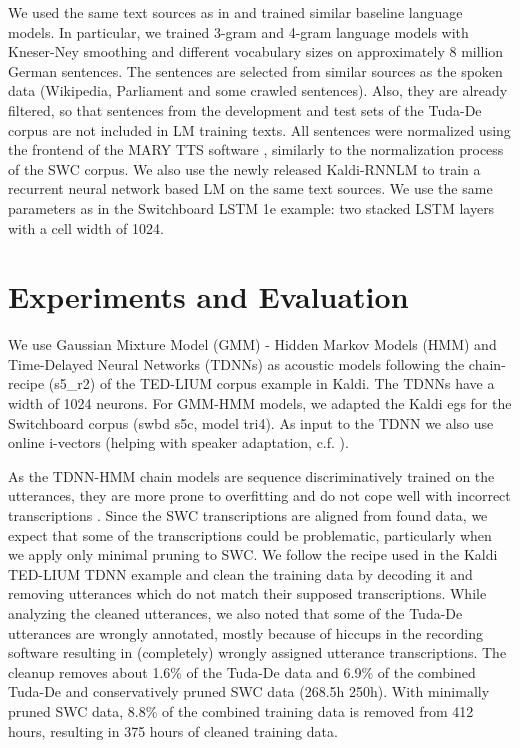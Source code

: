 \documentclass[a4paper]{article}
\begin{document}
We used the same text sources as in \cite{radeck2015open} and trained similar baseline language models. In particular, we trained 3-gram and 4-gram language models with Kneser-Ney smoothing \cite{kneser1995improved} and different vocabulary sizes on approximately 8 million German sentences. The sentences are selected from similar sources as the spoken data (Wikipedia, Parliament and some crawled sentences). Also, they are already filtered, so that sentences from the development and test sets of the Tuda-De corpus are not included in LM training texts. All sentences were normalized using the frontend of the MARY TTS software \cite{schroder2003german}, similarly to the normalization process of the SWC corpus.
We also use the newly released Kaldi-RNNLM \cite{xu2018neural} to train a recurrent neural network based LM on the same text sources. We use the same parameters as in the Switchboard LSTM 1e example: two stacked LSTM layers with a cell width of 1024.


\section{Experiments and Evaluation}
\label{sec:experiments}




We use Gaussian Mixture Model (GMM) - Hidden Markov Models (HMM) and Time-Delayed Neural Networks (TDNNs) \cite{waibel1990phoneme, peddinti2015time} as acoustic models following the chain-recipe (s5\_r2) of the TED-LIUM corpus \cite{rousseau2014enhancing} example in Kaldi. The TDNNs have a width of 1024 neurons. For GMM-HMM models, we adapted the Kaldi egs for the Switchboard corpus (swbd s5c, model tri4). As input to the TDNN we also use online i-vectors (helping with speaker adaptation, c.f. \cite{saon2013speaker, senior2014improving, miao2015speaker}). 

As the TDNN-HMM chain models are sequence discriminatively trained on the utterances, they are more prone to overfitting and do not cope well with incorrect transcriptions \cite{povey2016purely}. Since the SWC transcriptions are aligned from found data, we expect that some of the transcriptions could be problematic, particularly when we apply only minimal pruning to SWC. We follow the recipe used in the Kaldi TED-LIUM TDNN example and clean the training data by decoding it and removing utterances which do not match their supposed transcriptions. While analyzing the cleaned utterances, we also noted that some of the Tuda-De utterances are wrongly annotated, mostly because of hiccups in the recording software \cite{schnelle2014open} resulting in (completely) wrongly assigned utterance transcriptions. The cleanup removes about 1.6\% of the Tuda-De data and 6.9\% of the combined Tuda-De and conservatively pruned SWC data (268.5h  250h). With minimally pruned SWC data, 8.8\% of the combined training data is removed from 412 hours, resulting in 375 hours of cleaned training data.
\end{document}
